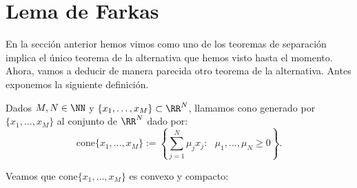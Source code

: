 \chapter{Lema de Farkas}
\newcommand{\bb}{\textbf{\emph{b}}}
\newcommand{\cc}{\textbf{\emph{c}}}

En la sección anterior hemos vimos como uno de los teoremas de separación implica el único teorema de la alternativa que hemos visto hasta el momento. Ahora, vamos a deducir de manera parecida otro teorema de la alternativa. Antes exponemos la siguiente definición.

\begin{definicion}
	Dados $ M, N \in \NN $ y $ \{x_1,\dots, x_M \} \subset \RR^N  $, llamamos cono generado por $ \{x_1,\dots, x_M \} $ al conjunto de $ \RR^N $ dado por:
	\begin{equation*}
	\mathrm{cone}\{x_1,\dots, x_M \} := \left\lbrace \sum_{j=1}^{N}{\mu_j x_j } : \text{ } \mu_1,...,\mu_N \geq 0 \right\rbrace .
	\end{equation*}
\end{definicion}

Veamos que $ \mathrm{cone}\{x_1,\dots, x_M \} $ es convexo y compacto:

